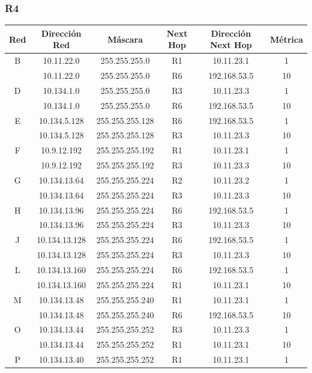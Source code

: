 \documentclass[12pt, a4paper, spanish]{article}
\begin{document}
\subsubsection{R4}
\begin{center}
\begin{tabular}{|c|c|c|c|c|c|}
	\hline
	Red & Dirección Red & Máscara & Next Hop & Dirección Next Hop & Métrica \\
	\hline
	\hline
	B & 10.11.22.0 & 255.255.255.0 & R1 & 10.11.23.1 & 1\\
	 & 10.11.22.0 & 255.255.255.0 & R6 & 192.168.53.5 & 10\\
	\hline
	D & 10.134.1.0 & 255.255.255.0 & R3 & 10.11.23.3 & 1\\
	 & 10.134.1.0 & 255.255.255.0 & R6 & 192.168.53.5 & 10\\
	\hline
	E & 10.134.5.128 & 255.255.255.128 & R6 & 192.168.53.5 & 1\\
	 & 10.134.5.128 & 255.255.255.128 & R3 & 10.11.23.3 & 10\\
	\hline
	F & 10.9.12.192 & 255.255.255.192 & R1 & 10.11.23.1 & 1\\
	 & 10.9.12.192 & 255.255.255.192 & R3 & 10.11.23.3 & 10\\
	\hline
	G & 10.134.13.64 & 255.255.255.224 & R2 & 10.11.23.2 & 1\\
	 & 10.134.13.64 & 255.255.255.224 & R3 & 10.11.23.3 & 10\\
	\hline
	H & 10.134.13.96 & 255.255.255.224 & R6 & 192.168.53.5 & 1\\
	 & 10.134.13.96 & 255.255.255.224 & R3 & 10.11.23.3 & 10\\
	\hline
	J & 10.134.13.128 & 255.255.255.224 & R6 & 192.168.53.5 & 1\\
	 & 10.134.13.128 & 255.255.255.224 & R3 & 10.11.23.3 & 10\\
	\hline
	L & 10.134.13.160 & 255.255.255.224 & R6 & 192.168.53.5 & 1\\
	 & 10.134.13.160 & 255.255.255.224 & R1 & 10.11.23.1 & 10\\
	\hline
	M & 10.134.13.48 & 255.255.255.240 & R1 & 10.11.23.1 & 1\\
	 & 10.134.13.48 & 255.255.255.240 & R6 & 192.168.53.5 & 10\\
	\hline
	O & 10.134.13.44 & 255.255.255.252 & R3 & 10.11.23.3 & 1\\
	 & 10.134.13.44 & 255.255.255.252 & R1 & 10.11.23.1 & 10\\
	\hline
	P & 10.134.13.40 & 255.255.255.252 & R1 & 10.11.23.1 & 1\\

\end{tabular}
\end{center}
\end{document}
